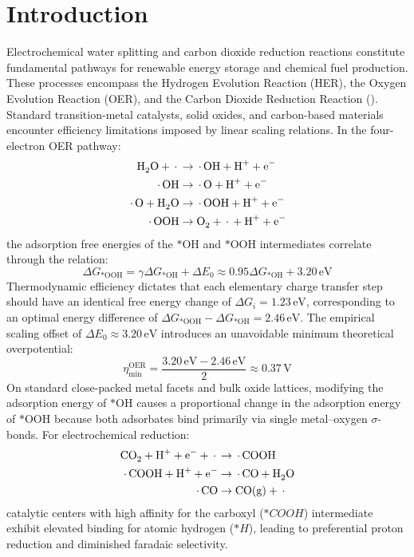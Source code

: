 \documentclass[journal=jacsat,manuscript=article]{achemso}
\begin{document}
\section{Introduction}

Electrochemical water splitting and carbon dioxide reduction reactions constitute fundamental pathways for renewable energy storage and chemical fuel production.\cite{seh2017combining, koper2013theory, norskov2004origin} These processes encompass the Hydrogen Evolution Reaction (HER), the Oxygen Evolution Reaction (OER), and the Carbon Dioxide Reduction Reaction (). Standard transition-metal catalysts, solid oxides, and carbon-based materials encounter efficiency limitations imposed by linear scaling relations.\cite{man2011universality, calle2015introducing} In the four-electron OER pathway:
\begin{align}
\ce{H2O + *} &\rightarrow \ce{*OH + H+ + e-} \label{eq:oer1} \\
\ce{*OH} &\rightarrow \ce{*O + H+ + e-} \label{eq:oer2} \\
\ce{*O + H2O} &\rightarrow \ce{*OOH + H+ + e-} \label{eq:oer3} \\
\ce{*OOH} &\rightarrow \ce{O2 + * + H+ + e-} \label{eq:oer4}
\end{align}
the adsorption free energies of the $*\text{OH}$ and $*\text{OOH}$ intermediates correlate through the relation:
\begin{equation}
\Delta G_{*\text{OOH}} = \gamma \Delta G_{*\text{OH}} + \Delta E_0 \approx 0.95 \Delta G_{*\text{OH}} + 3.20\,\text{eV}
\label{eq:scaling_oer}
\end{equation}
Thermodynamic efficiency dictates that each elementary charge transfer step should have an identical free energy change of $\Delta G_i = 1.23\,\text{eV}$, corresponding to an optimal energy difference of $\Delta G_{*\text{OOH}} - \Delta G_{*\text{OH}} = 2.46\,\text{eV}$. The empirical scaling offset of $\Delta E_0 \approx 3.20\,\text{eV}$ introduces an unavoidable minimum theoretical overpotential:\cite{koper2013theory}
\begin{equation}
\eta^{\text{OER}}_{\text{min}} = \frac{3.20\,\text{eV} - 2.46\,\text{eV}}{2} \approx 0.37\,\text{V}
\end{equation}
On standard close-packed metal facets and bulk oxide lattices, modifying the adsorption energy of $*\text{OH}$ causes a proportional change in the adsorption energy of $*\text{OOH}$ because both adsorbates bind primarily via single metal--oxygen $\sigma$-bonds.\cite{man2011universality} For electrochemical  reduction:
\begin{align}
\ce{CO2 + H+ + e- + *} &\rightarrow \ce{*COOH} \label{eq:co2rr1} \\
\ce{*COOH + H+ + e-} &\rightarrow \ce{*CO + H2O} \label{eq:co2rr2} \\
\ce{*CO} &\rightarrow \ce{CO(g) + *} \label{eq:co2rr3}
\end{align}
catalytic centers with high affinity for the carboxyl ($*COOH$) intermediate exhibit elevated binding for atomic hydrogen ($*H$), leading to preferential proton reduction and diminished faradaic selectivity.\cite{bagger2017electrochemical}
\end{document}
